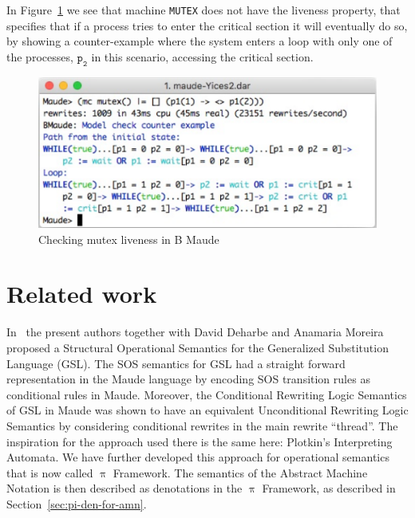 \documentclass[a4paper,openany]{book}
\makeatletter
\def\maxwidth{\ifdim\Gin@nat@width>\linewidth\linewidth
    \else\Gin@nat@width\fi}
\let\Oldincludegraphics\includegraphics
\renewcommand{\includegraphics}[1]{\Oldincludegraphics[width=.8\maxwidth]{#1}}
\makeatother
\begin{document}
In Figure~\ref{fig:mutex-liveness} we see that machine \texttt{MUTEX} does not have the liveness property, that specifies that if a process tries to enter the critical section it will eventually do so, by showing a counter-example where the system enters a loop with only one of the processes, $\mathtt{p_2}$ in this scenario, accessing the critical section.
\begin{figure}[ht]\centering
\includegraphics{mutex-liveness2}
\caption{Checking mutex liveness in B Maude}\label{fig:mutex-liveness}
\end{figure}

\section{Related work}\label{sec:related-work}

In~\cite{etmf:2016} the present authors together with David Deharbe and Anamaria Moreira proposed a Structural Operational Semantics for the Generalized Substitution Language (GSL). The SOS semantics for GSL had a straight forward representation in the Maude language by encoding SOS transition rules as conditional rules in Maude. Moreover, the Conditional Rewriting Logic Semantics of GSL in Maude was shown to have an equivalent Unconditional Rewriting Logic Semantics by considering conditional rewrites in the main rewrite ``thread''. The inspiration for the approach used there is the same here: Plotkin's Interpreting Automata. We have further developed this approach for operational semantics that is now called $\uppi$ Framework.
The semantics of the Abstract Machine Notation is then described as denotations in the $\uppi$ Framework, as described in Section~\ref{sec:pi-den-for-amn}.
\end{document}
